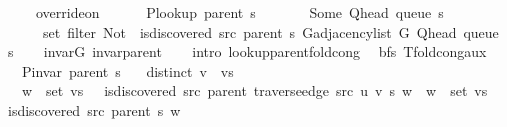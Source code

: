 \begin{isabellebody}
\ \ \ \ \ override{\isacharunderscore}{\kern0pt}on\isanewline
\ \ \ \ \ \ {\isacharparenleft}{\kern0pt}P{\isacharunderscore}{\kern0pt}lookup\ {\isacharparenleft}{\kern0pt}parent\ s{\isacharparenright}{\kern0pt}{\isacharparenright}{\kern0pt}\isanewline
\ \ \ \ \ \ {\isacharparenleft}{\kern0pt}{\isasymlambda}{\isacharunderscore}{\kern0pt}{\isachardot}{\kern0pt}\ Some\ {\isacharparenleft}{\kern0pt}Q{\isacharunderscore}{\kern0pt}head\ {\isacharparenleft}{\kern0pt}queue\ s{\isacharparenright}{\kern0pt}{\isacharparenright}{\kern0pt}{\isacharparenright}{\kern0pt}\isanewline
\ \ \ \ \ \ {\isacharparenleft}{\kern0pt}set\ {\isacharparenleft}{\kern0pt}filter\ {\isacharparenleft}{\kern0pt}Not\ {\isasymcirc}\ is{\isacharunderscore}{\kern0pt}discovered\ src\ {\isacharparenleft}{\kern0pt}parent\ s{\isacharparenright}{\kern0pt}{\isacharparenright}{\kern0pt}\ {\isacharparenleft}{\kern0pt}G{\isachardot}{\kern0pt}adjacency{\isacharunderscore}{\kern0pt}list\ G\ {\isacharparenleft}{\kern0pt}Q{\isacharunderscore}{\kern0pt}head\ {\isacharparenleft}{\kern0pt}queue\ s{\isacharparenright}{\kern0pt}{\isacharparenright}{\kern0pt}{\isacharparenright}{\kern0pt}{\isacharparenright}{\kern0pt}{\isacharparenright}{\kern0pt}{\isachardoublequoteclose}\isanewline
%
\isadelimproof
\ \ %
\endisadelimproof
%
\isatagproof
{}\isamarkupfalse%
\ invar{\isacharunderscore}{\kern0pt}G\ invar{\isacharunderscore}{\kern0pt}parent\isanewline
\ \ \isamarkupfalse%
\ {\isacharparenleft}{\kern0pt}intro\ lookup{\isacharunderscore}{\kern0pt}parent{\isacharunderscore}{\kern0pt}fold{\isacharunderscore}{\kern0pt}cong{\isacharunderscore}{\kern0pt}{}{\isacharparenright}{\kern0pt}%
\endisatagproof
{\isafoldproof}%
%
\isadelimproof
\isanewline
%
\endisadelimproof
%
\isadeliminvisible
\isanewline
%
\endisadeliminvisible
%
\isataginvisible
{}\isamarkupfalse%
\ {\isacharparenleft}{\kern0pt}\ bfs{\isacharparenright}{\kern0pt}\ T{\isacharunderscore}{\kern0pt}fold{\isacharunderscore}{\kern0pt}cong{\isacharunderscore}{\kern0pt}aux{\isacharcolon}{\kern0pt}\isanewline
\ \ \ {\isachardoublequoteopen}P{\isacharunderscore}{\kern0pt}invar\ {\isacharparenleft}{\kern0pt}parent\ s{\isacharparenright}{\kern0pt}{\isachardoublequoteclose}\isanewline
\ \ \ {\isachardoublequoteopen}distinct\ {\isacharparenleft}{\kern0pt}v\ {\isacharhash}{\kern0pt}\ vs{\isacharparenright}{\kern0pt}{\isachardoublequoteclose}\isanewline
\ \ \ {\isachardoublequoteopen}w\ {\isasymin}\ set\ vs\ {\isasymand}\ {\isasymnot}\ is{\isacharunderscore}{\kern0pt}discovered\ src\ {\isacharparenleft}{\kern0pt}parent\ {\isacharparenleft}{\kern0pt}traverse{\isacharunderscore}{\kern0pt}edge\ src\ u\ v\ s{\isacharparenright}{\kern0pt}{\isacharparenright}{\kern0pt}\ w\ {\isasymlongleftrightarrow}\ w\ {\isasymin}\ set\ vs\ {\isasymand}\ {\isasymnot}\ is{\isacharunderscore}{\kern0pt}discovered\ src\ {\isacharparenleft}{\kern0pt}parent\ s{\isacharparenright}{\kern0pt}\ w{\isachardoublequoteclose}%

\end{isabellebody}
